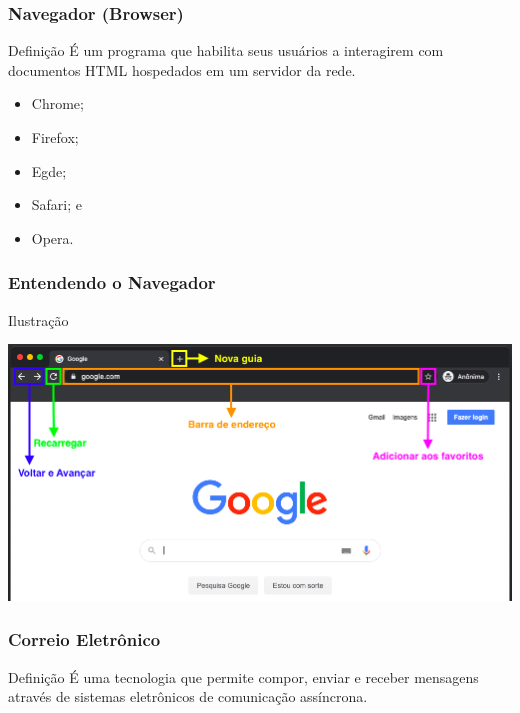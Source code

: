 \documentclass[aspectratio=169]{beamer} %
\begin{document}
\begin{frame}
	\frametitle{Navegador (Browser)}
	
	\begin{block}{Defini\c cão}
		É um programa que habilita seus usuários a interagirem com documentos HTML hospedados em um servidor da rede.
	\end{block} \vfill
		
	\begin{itemize}
		\item Chrome;
		\item Firefox;
		\item Egde;
		\item Safari; e
		\item Opera.
	\end{itemize}
\end{frame}

\begin{frame}
	\frametitle{Entendendo o Navegador}

	\begin{exampleblock}{Ilustra\c cão}
		\begin{center}
			\includegraphics[scale=0.35]{img/navegador}
		\end{center}
	\end{exampleblock}	
\end{frame}

\begin{frame}
	\frametitle{Correio Eletrônico}

	\begin{block}{Defini\c cão}
		É uma tecnologia que permite compor, enviar e receber mensagens através de sistemas eletrônicos de comunicação assíncrona.
	\end{block}
\end{frame}
\end{document}
